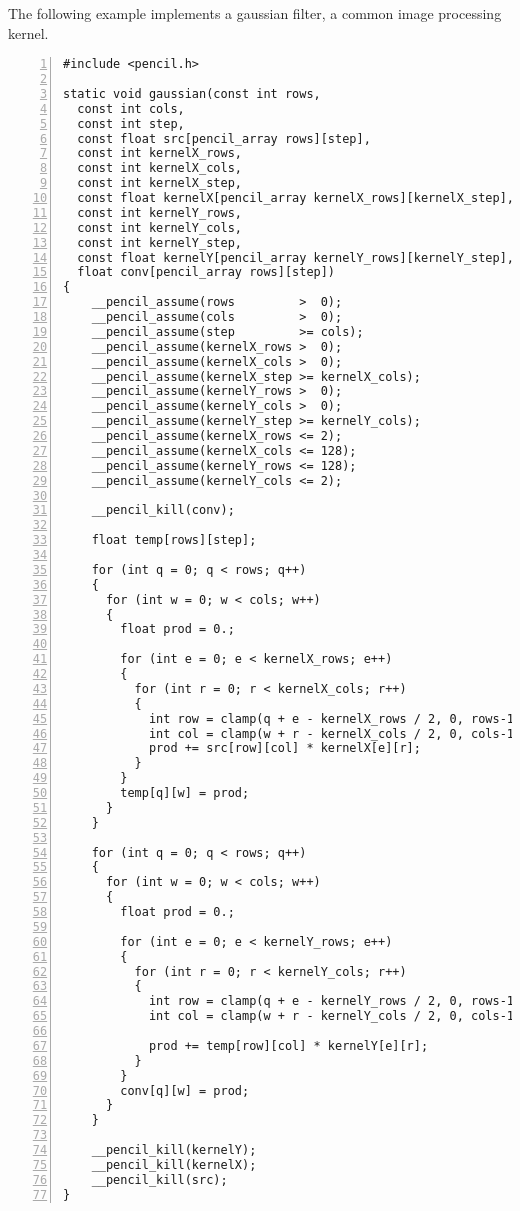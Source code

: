 The following example implements a gaussian filter,
a common image processing kernel.

\begin{lstlisting}[language=pencil,escapechar=@, numbers=left,numberstyle={\tiny\tt},numbersep=5pt]
#include <pencil.h>

static void gaussian(const int rows,
  const int cols,
  const int step,
  const float src[pencil_array rows][step],
  const int kernelX_rows,
  const int kernelX_cols,
  const int kernelX_step,
  const float kernelX[pencil_array kernelX_rows][kernelX_step],
  const int kernelY_rows,
  const int kernelY_cols,
  const int kernelY_step,
  const float kernelY[pencil_array kernelY_rows][kernelY_step],
  float conv[pencil_array rows][step])
{
    __pencil_assume(rows         >  0);
    __pencil_assume(cols         >  0);
    __pencil_assume(step         >= cols);
    __pencil_assume(kernelX_rows >  0);
    __pencil_assume(kernelX_cols >  0);
    __pencil_assume(kernelX_step >= kernelX_cols);
    __pencil_assume(kernelY_rows >  0);
    __pencil_assume(kernelY_cols >  0);
    __pencil_assume(kernelY_step >= kernelY_cols);
    __pencil_assume(kernelX_rows <= 2);
    __pencil_assume(kernelX_cols <= 128);
    __pencil_assume(kernelY_rows <= 128);
    __pencil_assume(kernelY_cols <= 2);

    __pencil_kill(conv);

    float temp[rows][step];

    for (int q = 0; q < rows; q++)
    {
      for (int w = 0; w < cols; w++)
      {
        float prod = 0.;

        for (int e = 0; e < kernelX_rows; e++)
        {
          for (int r = 0; r < kernelX_cols; r++)
          {
            int row = clamp(q + e - kernelX_rows / 2, 0, rows-1);
            int col = clamp(w + r - kernelX_cols / 2, 0, cols-1);
            prod += src[row][col] * kernelX[e][r];
          }
        }
        temp[q][w] = prod;
      }
    }
    
    for (int q = 0; q < rows; q++)
    {
      for (int w = 0; w < cols; w++)
      {
        float prod = 0.;

        for (int e = 0; e < kernelY_rows; e++)
        {
          for (int r = 0; r < kernelY_cols; r++)
          {
            int row = clamp(q + e - kernelY_rows / 2, 0, rows-1);
            int col = clamp(w + r - kernelY_cols / 2, 0, cols-1);

            prod += temp[row][col] * kernelY[e][r];
          }
        }
        conv[q][w] = prod;
      }
    }

    __pencil_kill(kernelY);
    __pencil_kill(kernelX);
    __pencil_kill(src);
}
\end{lstlisting}


